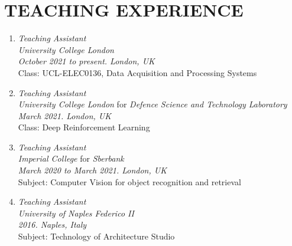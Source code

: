 \section*{TEACHING EXPERIENCE}
\begin{enumerate}[leftmargin=0.45cm, itemsep=0.4em, topsep=0.5em, parsep=0.2em]
    \item
    \emph{Teaching Assistant} \\
    \emph{University College London} \\
    \textit{October 2021 to \emph{present}. London, UK}  \\
    Class: UCL-ELEC0136, Data Acquisition and Processing Systems

    \item
    \emph{Teaching Assistant} \\
    \emph{University College London} for \emph{Defence Science and Technology Laboratory} \\
    \textit{March 2021. London, UK} \\
    Class: Deep Reinforcement Learning

    \item
    \emph{Teaching Assistant} \\
    \emph{Imperial College} for \emph{Sberbank} \\
    \textit{March 2020 to March 2021. London, UK} \\
    Subject: Computer Vision for object recognition and retrieval

    \item
    \emph{Teaching Assistant} \\
    \emph{University of Naples Federico II} \\
    \textit{2016. Naples, Italy} \\
    Subject: Technology of Architecture Studio
\end{enumerate}